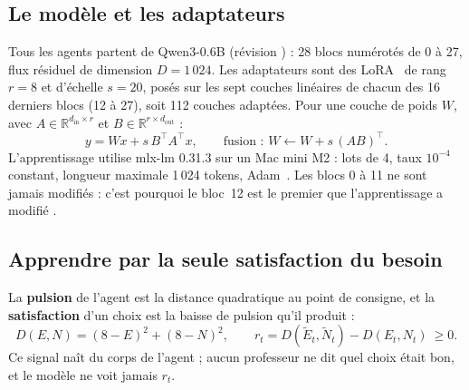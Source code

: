 \documentclass[11pt,a4paper]{article}
\newcommand{\code}[1]{\texttt{\detokenize{#1}}}
\begin{document}
\subsection{Le modèle et les adaptateurs}
\label{sec-lora}

Tous les agents partent de Qwen3-0.6B (révision \code{c1899de}) : 28 blocs
numérotés de 0 à 27, flux résiduel de dimension $D=1\,024$. Les adaptateurs
sont des LoRA~\cite{hu2021} de rang $r=8$ et d'échelle $s=20$, posés sur les sept
couches linéaires de chacun des 16 derniers blocs (12 à 27), soit 112 couches
adaptées. Pour une couche de poids $W$, avec $A\in\mathbb R^{d_\text{in}\times r}$
et $B\in\mathbb R^{r\times d_\text{out}}$ :
\begin{equation}
y = W x + s\,B^{\top}\!A^{\top}x, \qquad \text{fusion : } W\leftarrow W+s\,(AB)^{\top}.
\label{eq-lora}
\end{equation}
L'apprentissage utilise mlx-lm 0.31.3 sur un Mac mini M2 : lots de 4, taux
$10^{-4}$ constant, longueur maximale 1\,024 tokens, Adam~\cite{kingma2015}. Les blocs 0 à 11 ne
sont jamais modifiés : c'est pourquoi le bloc~12 est \og le premier que
l'apprentissage a modifié \fg{}.

\subsection{Apprendre par la seule satisfaction du besoin}
\label{sec-drive}

La \textbf{pulsion} de l'agent est la distance quadratique au point de consigne,
et la \textbf{satisfaction} d'un choix est la baisse de pulsion qu'il produit :
\begin{equation}
D(E,N)=(8-E)^2+(8-N)^2,\qquad r_t = D(\tilde E_t,\tilde N_t)-D(E_t,N_t)\ \ge 0 .
\label{eq-drive}
\end{equation}
Ce signal naît du corps de l'agent ; aucun professeur ne dit quel choix était bon,
et le modèle ne voit jamais $r_t$.
\end{document}
